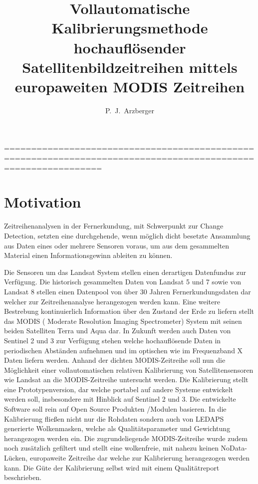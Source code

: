 \documentclass[11pt]{report}
\author{P.~J.~Arzberger}
\title{Vollautomatische Kalibrierungsmethode hochauflösender Satellitenbildzeitreihen mittels europaweiten MODIS Zeitreihen}
\begin{document}
\maketitle

\tableofcontents
% 
% 
==============================================================================================================
\chapter{Motivation}

Zeitreihenanalysen in der Fernerkundung, mit Schwerpunkt zur Change Detection, setzten eine durchgehende, wenn möglich dicht besetzte Ansammlung aus Daten eines oder mehrere Sensoren voraus, um aus dem gesammelten Material einen Informationsgewinn ableiten zu können.


Die Sensoren um das Landsat System stellen einen derartigen Datenfundus zur Verfügung. Die historisch gesammelten Daten von Landsat 5 und 7 sowie von Landsat 8 stellen einen Datenpool von über 30 Jahren Fernerkundungsdaten dar welcher zur Zeitreihenanalyse herangezogen werden kann. 
 Eine weitere Bestrebung kontinuierlich Information über den Zustand der Erde zu liefern stellt das MODIS ( Moderate Resolution Imaging Spectrometer) System mit seinen beiden Satelliten Terra und Aqua dar. In Zukunft werden auch Daten von Sentinel 2 und 3 zur Verfügung stehen welche hochauflösende Daten in periodischen Abständen aufnehmen und im optischen wie im Frequenzband X Daten liefern werden. Anhand der dichten MODIS-Zeitreihe soll nun die Möglichkeit einer vollautomatischen relativen Kalibrierung von Satellitensensoren wie Landsat an die MODIS-Zeitreihe untersucht werden. Die Kalibrierung  stellt eine Prototypenversion, dar welche portabel auf andere Systeme entwickelt werden soll, insbesondere mit Hinblick auf Sentinel 2 und 3. Die entwickelte Software soll rein auf Open Source Produkten /Modulen basieren. In die Kalibrierung fließen nicht nur die Rohdaten sondern auch von LEDAPS generierte Wolkenmasken, welche als Qualitätsparameter und Gewichtung herangezogen werden ein. Die zugrundeliegende MODIS-Zeitreihe wurde zudem noch zusätzlich gefiltert und stellt eine wolkenfreie, mit nahezu keinen NoData-Lücken, europaweite Zeitreihe dar welche zur Kalibrierung herangezogen werden kann. Die Güte der Kalibrierung selbst wird mit einem Qualitätreport beschrieben. 
\end{document}
